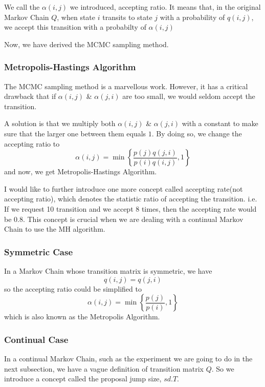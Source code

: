 We call the $\alpha(i,j)$ we introduced, accepting ratio. It means that, in the original Markov Chain $Q$, when state $i$ transits to state $j$ with a probability of $q(i,j)$, we accept this transition with a probabilty of $\alpha(i,j)$

Now, we have derived the MCMC sampling method.

\subsubsection{Metropolis-Hastings Algorithm}
The MCMC sampling method is a marvellous work. However, it has a critical drawback that if $\alpha(i,j)$ \& $\alpha(j,i)$ are too small, we would seldom accept the transition.

A solution is that we multiply both $\alpha(i,j)$ \& $\alpha(j,i)$ with a constant to make sure that the larger one between them equals $1$. By doing so, we change the accepting ratio to
\begin{equation}
\alpha(i,j) = \min\left\{\frac{p(j)q(j,i)}{p(i)q(i,j)},1\right\}
\end{equation}
and now, we get Metropolis-Hastings Algorithm\cite{hastings1970monte}.

I would like to further introduce one more concept called accepting rate(not accepting ratio), which denotes the statistic ratio of accepting the transition. i.e. If we request 10 transition and we accept 8 times, then the accepting rate would be 0.8. This concept is crucial when we are dealing with a continual Markov Chain to use the MH algorithm.



\subsubsection{Symmetric Case}
In a Markov Chain whose transition matrix is symmetric, we have
$$q(i,j)=q(j,i)$$
so the accepting ratio could be simplified to 
\begin{equation}
\alpha(i,j) = \min\left\{\frac{p(j)}{p(i)},1\right\}
\end{equation}
which is also known as the Metropolis Algorithm\cite{metropolis1953equation}.

\subsubsection{Continual Case}
In a continual Markov Chain, such as the experiment we are going to do in the next subsection, we have a vague definition of transition matrix $Q$. So we introduce a concept called the proposal jump size, $sd.T$.

